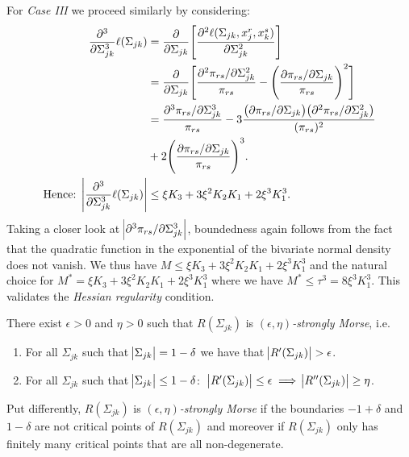 \begin{condition}
    For \textit{Case III} we proceed similarly by considering:
    \begin{equation}
        \begin{split}
            \frac{\partial^3}{\partial\Sigma_{jk}^3}\ell(\Sigma_{jk}) &= \frac{\partial}{\partial\Sigma_{jk}}\Bigg[\frac{\partial^2 \ell(\Sigma_{jk}, x_j^r,x_k^s)}{\partial \Sigma_{jk}^{2}}\Bigg] \\
            &= \frac{\partial}{\partial\Sigma_{jk}}\Bigg[\frac{\partial^2 \pi_{rs}/\partial \Sigma_{jk}^{2}}{\pi_{rs}} - \Bigg(\frac{\partial \pi_{rs}/\partial \Sigma_{jk}}{\pi_{rs}}\Bigg)^2\Bigg] \\
            &= \frac{\partial^3 \pi_{rs} / \partial \Sigma_{jk}^3}{\pi_{rs}} - 3\frac{\big(\partial \pi_{rs} / \partial \Sigma_{jk}\big)\big( \partial^2 \pi_{rs} / \partial \Sigma_{jk}^2\big)}{(\pi_{rs})^2} \\
            &+ 2\Bigg(\frac{\partial \pi_{rs} / \partial \Sigma_{jk}}{\pi_{rs}}\Bigg)^3. \\
            \text{Hence: } \abs{\frac{\partial^3}{\partial\Sigma_{jk}^3}\ell(\Sigma_{jk})} &\leq \xi K_3 + 3\xi^2K_2K_1 + 2 \xi^3K_1^3.
        \end{split}        
    \end{equation}
    Taking a closer look at $\abs{\partial^3 \pi_{rs} / \partial \Sigma_{jk}^3}$, boundedness again follows from the fact that the quadratic function in the exponential of the bivariate normal density does not vanish. We thus have $M \leq \xi K_3 + 3\xi^2K_2K_1 + 2 \xi^3K_1^3$ and the natural choice for $M^* = \xi K_3 + 3\xi^2K_2K_1 + 2 \xi^3K_1^3$ where we have $M^* \leq \tau^3 = 8\xi^3K_1^3$. This validates the \textit{Hessian regularity} condition.      
    
    \begin{condition}
        There exist $\epsilon > 0$ and $\eta > 0$ such that $R(\Sigma_{jk})$ is $(\epsilon,\eta)$\textit{-strongly Morse}, i.e.
        \begin{enumerate}
            \item For all $\Sigma_{jk}$ such that $\abs{\Sigma_{jk}} = 1-\delta$ we have that $\abs{R^\prime(\Sigma_{jk})} > \epsilon$.
            \item For all $\Sigma_{jk}$ such that $\abs{\Sigma_{jk}} \leq 1-\delta$: $\ \abs{R^\prime(\Sigma_{jk})} \leq \epsilon \implies \abs{R^{\prime\prime}(\Sigma_{jk})} \geq \eta$.
        \end{enumerate}
        Put differently, $R(\Sigma_{jk})$ is $(\epsilon,\eta)$\textit{-strongly Morse} if the boundaries $-1+ \delta$ and $1-\delta$ are not critical points of $R(\Sigma_{jk})$ and moreover if $R(\Sigma_{jk})$ only has finitely many critical points that are all non-degenerate.    
        

\end{condition}
\end{condition}

